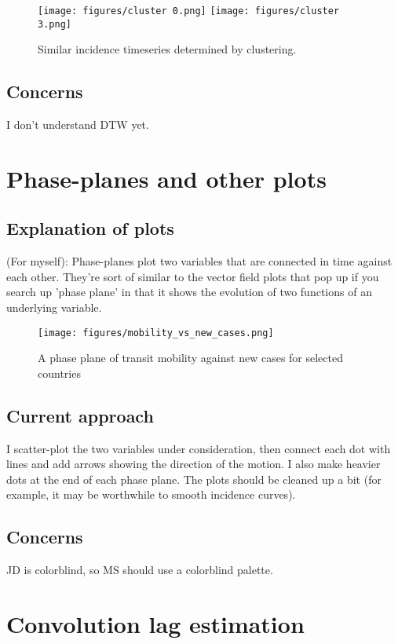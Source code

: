 \documentclass{article}
\begin{document}
\begin{figure}[h!]
    \centering
    \texttt{[image: figures/cluster 0.png]}
    \texttt{[image: figures/cluster 3.png]}
    \caption{Similar incidence timeseries determined by clustering.}
    \label{fig:my_label}
\end{figure}

\subsection{Concerns}
I don't understand DTW yet. 

\section{Phase-planes and other plots}
\subsection{Explanation of plots}
(For myself): Phase-planes plot two variables that are connected in time against each other. They're sort of similar to the vector field plots that pop up if you search up 'phase plane' in that it shows the evolution of two functions of an underlying variable.

\begin{figure}[h!]
    \centering
    \texttt{[image: figures/mobility\_vs\_new\_cases.png]}
    \caption{A phase plane of transit mobility against new cases for selected countries}
    \label{fig:my_label}
\end{figure}

\pagebreak


\subsection{Current approach}
I scatter-plot the two variables under consideration, then connect each dot with lines and add arrows showing the direction of the motion. I also make heavier dots at the end of each phase plane. The plots should be cleaned up a bit (for example, it may be worthwhile to smooth incidence curves).

\subsection{Concerns}
JD is colorblind, so MS should use a colorblind palette.

\section{Convolution lag estimation}
\end{document}
